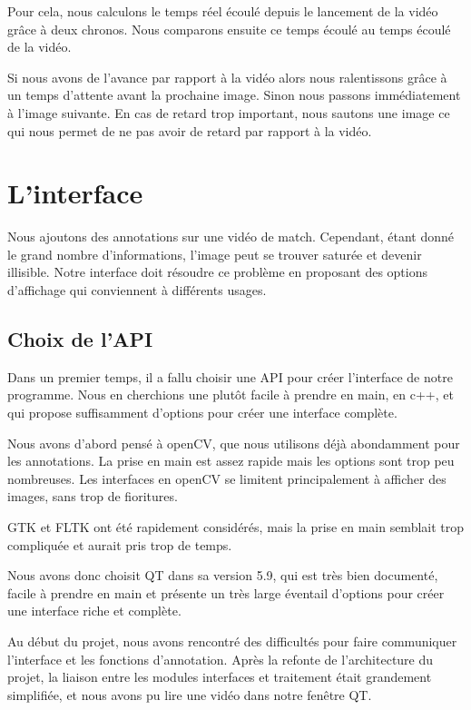 Pour cela, nous calculons le temps réel écoulé depuis le lancement de la vidéo grâce à deux chronos. Nous comparons ensuite ce temps écoulé au temps écoulé de la vidéo.
\bigskip

Si nous avons de l'avance par rapport à la vidéo alors nous ralentissons grâce à un temps d'attente avant la prochaine image. 
Sinon nous passons immédiatement à l'image suivante. En cas de retard trop important, nous sautons une image ce qui nous permet de ne pas avoir de retard par rapport à la vidéo.

\section{L'interface}


Nous ajoutons des annotations sur une vidéo de match. Cependant, étant donné le grand nombre d'informations, l'image peut se trouver saturée et devenir illisible. Notre interface doit résoudre ce problème en proposant des options d'affichage qui conviennent à différents usages.
\bigskip

\subsection{Choix de l'API}

Dans un premier temps, il a fallu choisir une API pour créer l'interface de notre programme. Nous en cherchions une plutôt facile à prendre en main, en c++, et qui propose suffisamment d'options pour créer une interface complète. 
\bigskip

Nous avons d'abord pensé à openCV, que nous utilisons déjà abondamment pour les annotations. La prise en main est assez rapide mais les options sont trop peu nombreuses. Les interfaces en openCV se limitent principalement à afficher des images, sans trop de fioritures. 
\bigskip

GTK et FLTK ont été rapidement considérés, mais la prise en main semblait trop compliquée et aurait pris trop de temps. 
\bigskip

Nous avons donc choisit QT dans sa version 5.9, qui est très bien documenté, facile à prendre en main et présente un très large éventail d'options pour créer une interface riche et complète.
\bigskip

Au début du projet, nous avons rencontré des difficultés pour faire communiquer l'interface et les fonctions d'annotation. Après la refonte de l'architecture du projet, la liaison entre les modules interfaces et traitement était grandement simplifiée, et nous avons pu lire une vidéo dans notre fenêtre QT. 
\bigskip

